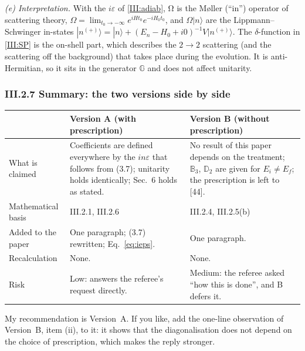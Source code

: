 \emph{(e) Interpretation.} With the $i\varepsilon$ of \eqref{III:adiab}, Ω is the M\o ller (``in'') operator of scattering theory, $\Omega=\lim_{t_0\to-\infty}e^{iHt_0}e^{-iH_0t_0}$, and $\Omega|n\rangle$ are the Lippmann--Schwinger in-states $|n^{(+)}\rangle=|n\rangle+(E_n-H_0+i0)^{-1}V|n^{(+)}\rangle$. The $\delta$-function in \eqref{III:SP} is the on-shell part, which describes the $2\to2$ scattering (and the scattering off the background) that takes place during the evolution. It is anti-Hermitian, so it sits in the generator $\mathbb G$ and does not affect unitarity.

\subsubsection*{III.2.7 Summary: the two versions side by side}

\begin{center}
\small
\renewcommand{\arraystretch}{1.3}
\begin{tabular}{p{3.0cm}p{5.8cm}p{5.8cm}}
\toprule
 & \textbf{Version A (with prescription)} & \textbf{Version B (without prescription)}\\
\midrule
What is claimed & Coefficients are defined everywhere by the $in\varepsilon$ that follows from (3.7); unitarity holds identically; Sec.~6 holds as stated. & No result of this paper depends on the treatment; $\mathbb B_3$, $\mathbb D_2$ are given for $E_i\neq E_f$; the prescription is left to [44].\\
Mathematical basis & III.2.1, III.2.6 & III.2.4, III.2.5(b)\\
Added to the paper & One paragraph; (3.7) rewritten; Eq.~\eqref{eq:ieps}. & One paragraph.\\
Recalculation & None. & None.\\
Risk & Low: answers the referee's request directly. & Medium: the referee asked ``how this is done'', and B defers it.\\
\bottomrule
\end{tabular}
\end{center}
My recommendation is Version~A. If you like, add the one-line observation of Version~B, item (ii), to it: it shows that the diagonalisation does not depend on the choice of prescription, which makes the reply stronger.
